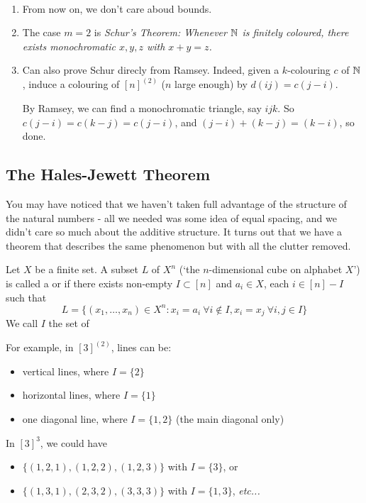 \documentclass[10pt]{article}
\begin{document}
\begin{remark*}[Remarks]\ 
    \begin{enumerate}
        \item From now on, we don't care aboud bounds.
        \item The case $m = 2$ is \it{Schur's Theorem}: Whenever $\mathbb{N}$ is finitely coloured, there exists monochromatic $x,y,z$ with $x + y = z$.
        \item Can also prove Schur direcly from Ramsey. Indeed, given a $k$-colouring $c$ of $\mathbb{N}$, induce a colouring of $[n]^{(2)}$ ($n$ large enough) by $d(ij) = c(j-i)$.
        
        By Ramsey, we can find a monochromatic triangle, say $ijk$. So $c(j-i) = c(k-j) = c(j-i)$, and $(j-i) + (k-j) = (k-i)$, so done.
    \end{enumerate}
\end{remark*}

\subsection{The Hales-Jewett Theorem}

You may have noticed that we haven't taken full advantage of the structure of the natural numbers - all we needed was some idea of equal spacing, and we didn't care so much about the additive structure. It turns out that we have a theorem that describes the same phenomenon but with all the clutter removed.

\begin{defin*}
Let $X$ be a finite set. A subset $L$ of $X^n$ (`the $n$-dimensional cube on alphabet $X$') is called a  or  if there exists non-empty $I\subset [n]$ and $a_i \in X$, each $i \in [n] - I$ such that $$L = \{(x_1,\dots,x_n)\in X^n: x_i = a_i\ \forall i \not\in I, x_i = x_j\ \forall i,j\in I\}$$
We call $I$ the set of \undf{active coordinates}
\end{defin*}

For example, in $[3]^{(2)}$, lines can be:
\begin{itemize}
    \item vertical lines, where $I = \{2\}$
    \item horizontal lines, where $I = \{1\}$
    \item one diagonal line, where $I = \{1,2\}$ (the main diagonal only)
\end{itemize}
In $[3]^{3}$, we could have
\begin{itemize}
    \item $\{(1,2,1),(1,2,2),(1,2,3)\}$ with $I = \{3\}$, or
    \item $\{(1,3,1),(2,3,2),(3,3,3)\}$ with $I = \{1,3\}$, \it{etc}...
\end{itemize}
\end{document}
